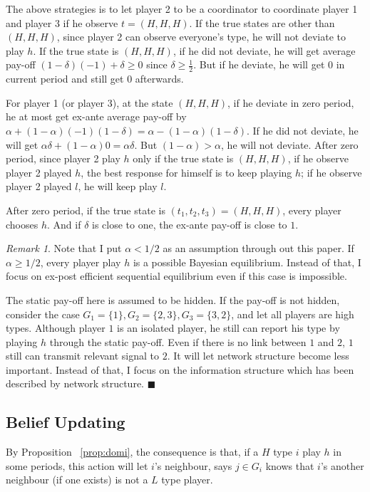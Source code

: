 \documentclass[12pt,letter]{article}
\theoremstyle{remark}
\theoremstyle{remark}
\newtheorem*{remark}{Remark}
\theoremstyle{claim}
\begin{document}
The above strategies is to let player 2 to be a coordinator to coordinate player 1 and player 3 if he observe $t=(H,H,H)$. If the true states are other than $(H,H,H)$, since player 2 can observe everyone's type, he will not deviate to play $h$. If the true state is $(H,H,H)$, if he did not deviate, he will get average pay-off $(1-\delta)(-1)+\delta\geq 0$ since $\delta\geq \frac{1}{2}$. But if he deviate, he will get $0$ in current period and still get $0$ afterwards. 

For player 1 (or player 3), at the state $(H,H,H)$, if he deviate in zero period, he at most get ex-ante average pay-off by $\alpha+(1-\alpha)(-1)(1-\delta)=\alpha-(1-\alpha)(1-\delta)$. If he did not deviate, he will get $\alpha\delta+(1-\alpha)0=\alpha\delta$. But $(1-\alpha)>\alpha$, he will not deviate. After zero period, since player 2 play $h$ only if the true state is $(H,H,H)$, if he observe player 2 played $h$, the best response for himself is to keep playing $h$; if he observe player 2 played $l$, he will keep play $l$.

After zero period, if the true state is $(t_1,t_2,t_3)=(H,H,H)$, every player chooses $h$. And if $\delta$ is close to one, the ex-ante pay-off is close to $1$.

\begin{remark}
Note that I put $\alpha<1/2$ as an assumption through out this paper. If $\alpha\geq 1/2$, every player play $h$ is a possible Bayesian equilibrium. Instead of that, I focus on ex-post efficient sequential equilibrium even if this case is impossible.

The static pay-off here is assumed to be hidden. If the pay-off is not hidden, consider the case $G_1=\{1\},G_2=\{2,3\},G_3=\{3,2\}$, and let all players are high types. Although player $1$ is an isolated player, he still can report his type by playing $h$ through the static pay-off. Even if there is no link between $1$ and $2$, $1$ still can transmit relevant signal to $2$. It will let network structure become less important. Instead of that, I focus on the information structure which has been described by network structure. $\blacksquare$
\end{remark}

\subsection{Belief Updating}

By Proposition ~\ref{prop:domi}, the consequence is that, if a $H$ type $i$ play $h$ in some periods, this action will let $i$'s neighbour, says $j\in G_i$ knows that $i$'s another neighbour (if one exists) is not a $L$ type player.
\end{document}
